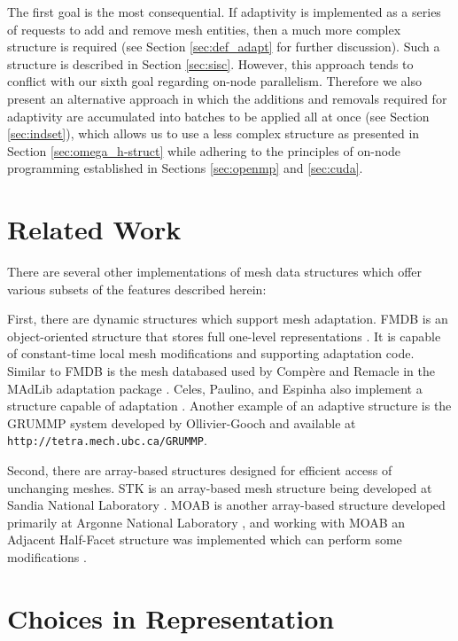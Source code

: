 The first goal is the most consequential.
If adaptivity is implemented as a series of requests to
add and remove mesh entities, then a much more complex structure is required
(see Section \ref{sec:def_adapt} for further discussion).
Such a structure is described in Section \ref{sec:sisc}.
However, this approach tends to conflict with our sixth goal regarding
on-node parallelism.
Therefore we also present an alternative
approach in which the additions and removals required for adaptivity
are accumulated into batches to be applied all at once
(see Section \ref{sec:indset}), which allows us to use a less complex structure
as presented in Section \ref{sec:omega_h-struct} while adhering to the
principles of on-node programming established in Sections
\ref{sec:openmp} and \ref{sec:cuda}.

\section{Related Work}

There are several other implementations of mesh data structures
which offer various subsets of the features described herein:

First, there are dynamic structures which support mesh adaptation.
FMDB is an object-oriented structure that
stores full one-level representations \cite{seol2006efficient}.
It is capable of constant-time local
mesh modifications and supporting adaptation code.
Similar to FMDB is the mesh databased used by Comp\`{e}re and Remacle
in the MAdLib adaptation package \cite{compere2010mesh}.
Celes, Paulino, and Espinha also implement a structure capable of
adaptation \cite{celes2005compact}.
Another example of an adaptive structure
is the GRUMMP system developed by Ollivier-Gooch
and available at \texttt{http://tetra.mech.ubc.ca/GRUMMP}.

Second, there are array-based structures designed for
efficient access of unchanging meshes.
STK is an array-based mesh structure being developed at
Sandia National Laboratory \cite{edwards2010sierra}.
MOAB is another array-based structure developed primarily
at Argonne National Laboratory \cite{tautges_moab:_2004},
and working with MOAB an Adjacent Half-Facet structure
was implemented which can perform some modifications \cite{dyedov2014ahf}.

\section{Choices in Representation}

